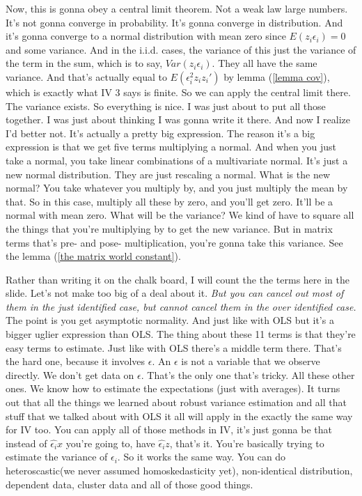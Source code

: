\documentclass[11pt,a4paper]{amsart}
\theoremstyle{plain}
\theoremstyle{definition}
\begin{document}
 		Now, this is gonna obey a central limit theorem. Not a weak law large numbers. It's not gonna converge in probability. It's gonna converge in distribution. And it's gonna converge to a normal distribution with mean zero since $E(z_{i}\epsilon_{i}) = 0$ and some variance. And in the i.i.d. cases, the variance of this just the variance of the term in the sum, which is to say, $Var(z_{i}\epsilon_{i})$. They all have the same variance. And that's actually equal to $E(\epsilon_{i}^{2}z_{i}z_{i}')$ by lemma (\ref{lemma cov}), which is exactly what IV 3 says is finite. So we can apply the central limit there. The variance exists. So everything is nice. I was just about to put all those together. I was just about thinking I was gonna write it there. And now I realize I'd better not. It's actually a pretty big expression.  The reason it's a big expression is that we get five terms multiplying a normal. And when you just take a normal, you take linear combinations of a multivariate normal. It's just a new normal distribution. They are just rescaling a normal.  What is the new normal? You take whatever you multiply by, and you just multiply the mean by that. So in this case, multiply all these by zero, and you'll get zero. It'll be a normal with mean zero. What will be the variance? We kind of have to square all the things that you're multiplying by to get the new variance. But in matrix terms that's pre- and pose- multiplication, you're gonna take this variance. See the lemma (\ref{the matrix world constant}).\par 
 		Rather than writing it on the chalk board, I will count the the terms here in the slide.  Let's not make too big of a deal about it. \emph{But you can cancel out most of them in the just identified case, but cannot cancel them in the over identified case.} The point is you get asymptotic normality. And just like with OLS but it's a bigger uglier expression than OLS. The thing about these 11 terms is that they're easy terms to estimate. Just like with OLS there's a middle term there. That's the hard one, because it involves $\epsilon$. An $\epsilon$ is not a variable that we observe directly. We don't get data on $\epsilon$. That's the only one that's tricky. All these other ones. We know how to estimate the expectations (just with averages). It turns out that all the things we learned about robust variance estimation and all that stuff that we talked about with OLS it all will apply in the exactly the same way for IV too. You can apply all of those methods in IV, it's just gonna be that instead of $\hat{\epsilon_{i}}x$ you're going to, have $\hat{\epsilon_{i}}z$, that's it. You're basically trying to estimate the variance of $\epsilon_{i}$. So it works the same way. You can do heteroscastic(we never assumed homoskedasticity yet), non-identical distribution, dependent data, cluster data and all of those good things.\par 
\end{document}
